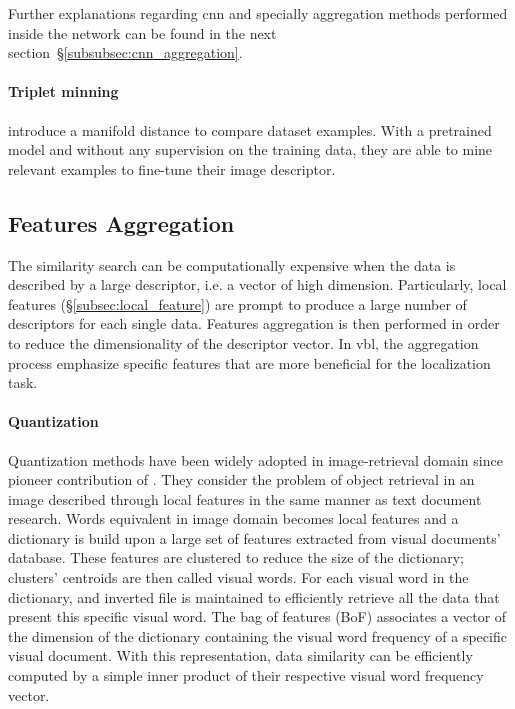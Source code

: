 Further explanations regarding \ac{cnn} and specially aggregation methods performed inside the network can be found in the next section~\S\ref{subsubsec:cnn_aggregation}.


\paragraph{Triplet minning}

\citet{Iscen2018} introduce a manifold distance to compare dataset examples. With a pretrained model and without any supervision on the training data, they are able to mine relevant examples to fine-tune their image descriptor.

\subsection{Features Aggregation}
\label{subsec:features_aggregation}
The similarity search can be computationally expensive when the data is described by a large descriptor, i.e. a vector of high dimension. Particularly, local features (\S\ref{subsec:local_feature}) are prompt to produce a large number of descriptors for each single data. Features aggregation is then performed in order to reduce the dimensionality of the descriptor vector. In \ac{vbl}, the aggregation process emphasize specific features that are more beneficial for the localization task.

\paragraph{Quantization}
Quantization methods have been widely adopted in image-retrieval domain since pioneer contribution of \citet{Sivic2003}. They consider the problem of object retrieval in an image described through local features in the same manner as text document research. Words equivalent in image domain becomes local features and a dictionary is build upon a large set of features extracted from visual documents' database. These features are clustered to reduce the size of the dictionary; clusters' centroids are then called visual words. For each visual word in the dictionary, and inverted file is maintained to efficiently retrieve all the data that present this specific visual word. The bag of features (BoF) associates a vector of the dimension of the dictionary containing the visual word frequency of a specific visual document. With this representation, data similarity can be efficiently computed by a simple inner product of their respective visual word frequency vector.

